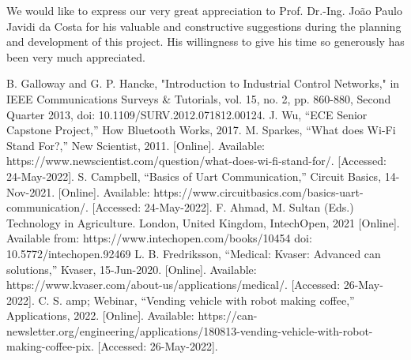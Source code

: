 \documentclass[conference]{IEEEtran}
\begin{document}
We would like to express our very great appreciation to Prof. Dr.-Ing.  João Paulo Javidi da Costa  for his valuable and constructive suggestions during the planning and development of this project. His willingness to give his time so generously has been very much appreciated.


\begin{thebibliography}{00}
 B. Galloway and G. P. Hancke, "Introduction to Industrial Control Networks," in IEEE Communications Surveys & Tutorials, vol. 15, no. 2, pp. 860-880, Second Quarter 2013, doi: 10.1109/SURV.2012.071812.00124. 
  J. Wu, “ECE Senior Capstone Project,” How Bluetooth Works, 2017. 
  M. Sparkes, “What does Wi-Fi Stand For?,” New Scientist, 2011. [Online]. Available: https://www.newscientist.com/question/what-does-wi-fi-stand-for/. [Accessed: 24-May-2022]. 
  S. Campbell, “Basics of Uart Communication,” Circuit Basics, 14-Nov-2021. [Online]. Available: https://www.circuitbasics.com/basics-uart-communication/. [Accessed: 24-May-2022]. 
  F. Ahmad, M. Sultan (Eds.) Technology in Agriculture. London, United Kingdom, IntechOpen, 2021 [Online]. Available from: https://www.intechopen.com/books/10454 doi: 10.5772/intechopen.92469
 L. B. Fredriksson, “Medical: Kvaser: Advanced can solutions,” Kvaser, 15-Jun-2020. [Online]. Available: https://www.kvaser.com/about-us/applications/medical/. [Accessed: 26-May-2022].
 C. S. amp; Webinar, “Vending vehicle with robot making coffee,” Applications, 2022. [Online]. Available: https://can-newsletter.org/engineering/applications/180813-vending-vehicle-with-robot-making-coffee-pix. [Accessed: 26-May-2022].

\end{thebibliography}


%
% 
\end{document}
